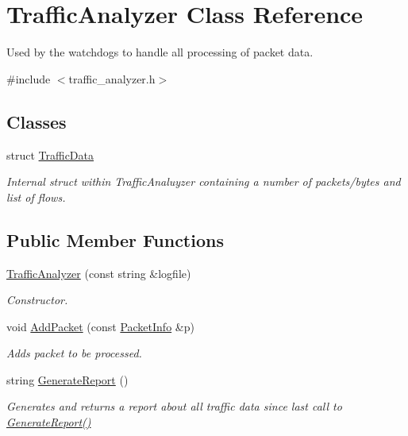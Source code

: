 \hypertarget{classTrafficAnalyzer}{\section{Traffic\-Analyzer Class Reference}
\label{classTrafficAnalyzer}
}


Used by the watchdogs to handle all processing of packet data.  




{\ttfamily \#include $<$traffic\-\_\-analyzer.\-h$>$}

\subsection*{Classes}
\begin{DoxyCompactItemize}
\item 
struct \hyperlink{structTrafficAnalyzer_1_1TrafficData}{Traffic\-Data}
\begin{DoxyCompactList}\small\item\em Internal struct within Traffic\-Analuyzer containing a number of packets/bytes and list of flows. \end{DoxyCompactList}\end{DoxyCompactItemize}
\subsection*{Public Member Functions}
\begin{DoxyCompactItemize}
\item 
\hyperlink{classTrafficAnalyzer_a9216a001cdfbdf97f40338053a434271}{Traffic\-Analyzer} (const string \&logfile)
\begin{DoxyCompactList}\small\item\em Constructor. \end{DoxyCompactList}\item 
void \hyperlink{classTrafficAnalyzer_ab7007a89e1a7be25847ce43818cf14ed}{Add\-Packet} (const \hyperlink{structPacketInfo}{Packet\-Info} \&p)
\begin{DoxyCompactList}\small\item\em Adds packet to be processed. \end{DoxyCompactList}\item 
string \hyperlink{classTrafficAnalyzer_a2b8c62dbaa795490d08274eac4c53e57}{Generate\-Report} ()
\begin{DoxyCompactList}\small\item\em Generates and returns a report about all traffic data since last call to \hyperlink{classTrafficAnalyzer_a2b8c62dbaa795490d08274eac4c53e57}{Generate\-Report()} \end{DoxyCompactList}\end{DoxyCompactItemize}
